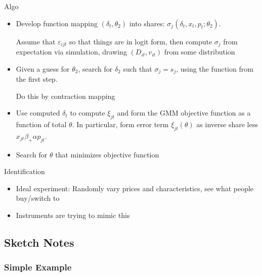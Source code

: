 \documentclass[12pt]{article}
\theoremstyle{plain}
\theoremstyle{definition}
\theoremstyle{remark}
\begin{document}
Algo
\begin{itemize}
  \item Develop function mapping $(\delta_t,\theta_2)$ into shares:
    $\sigma_j(\delta_t,x_t,p_t;\theta_2)$.

    Assume that $\varepsilon_{ijt}$ so that things are in logit form,
    then compute $\sigma_j$ from expectation via simulation, drawing
    $(D_{it},v_{it})$ from some distribution

  \item Given a guess for $\theta_2$, search for $\delta_2$ such that
    $\sigma_j=s_j$, using the function from the first step.

    Do this by contraction mapping

  \item
    Use computed $\delta_t$ to compute $\xi_{jt}$ and form the GMM
    objective function as a function of total $\theta$.
    In particular, form error term $\xi_{jt}(\theta)$ as
    inverse share less $x_{jt}\beta_+\alpha p_{jt}$.

  \item Search for $\theta$ that minimizes objective function
\end{itemize}
Identification
\begin{itemize}
  \item Ideal experiment: Randomly vary prices and characteristics, see
    what people buy/switch to
  \item Instruments are trying to mimic this
\end{itemize}



\clearpage
\subsection{Sketch Notes}

\subsubsection{Simple Example}
\end{document}

